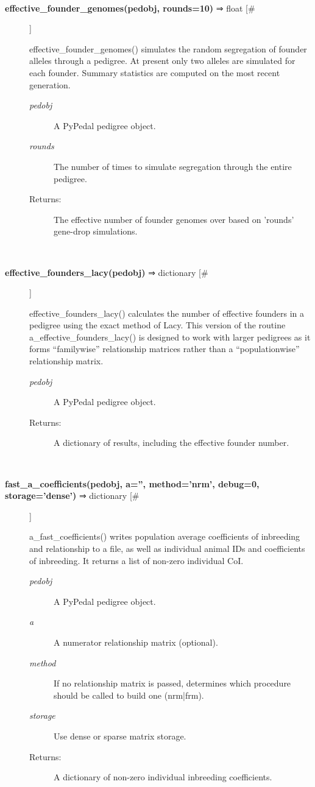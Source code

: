 \documentclass[10pt]{article}
\begin{document}
\begin{description}
\begin{description}
\end{description}
\\ 

\item[\textbf{effective\_founder\_genomes(pedobj, rounds=10)}
 ⇒ float [\#]]

 effective\_founder\_genomes() simulates the random segregation of founder alleles through a pedigree. At present only two alleles are simulated for each founder. Summary statistics are computed on the most recent generation.
\begin{description}
\item[\emph{pedobj}
] A PyPedal pedigree object.
\item[\emph{rounds}
] The number of times to simulate segregation through the entire pedigree.
\item[Returns:] The effective number of founder genomes over based on 'rounds' gene-drop simulations.

\end{description}
\\ 

\item[\textbf{effective\_founders\_lacy(pedobj)}
 ⇒ dictionary [\#]]

 effective\_founders\_lacy() calculates the number of effective founders in a pedigree using the exact method of Lacy. This version of the routine a\_effective\_founders\_lacy() is designed to work with larger pedigrees as it forms ``familywise'' relationship matrices rather than a ``populationwise'' relationship matrix.
\begin{description}
\item[\emph{pedobj}
] A PyPedal pedigree object.
\item[Returns:] A dictionary of results, including the effective founder number.

\end{description}
\\ 

\item[\textbf{fast\_a\_coefficients(pedobj, a='', method='nrm', debug=0, storage='dense')}
 ⇒ dictionary [\#]]

 a\_fast\_coefficients() writes population average coefficients of inbreeding and relationship to a file, as well as individual animal IDs and coefficients of inbreeding. It returns a list of non-zero individual CoI.
\begin{description}
\item[\emph{pedobj}
] A PyPedal pedigree object.
\item[\emph{a}
] A numerator relationship matrix (optional).
\item[\emph{method}
] If no relationship matrix is passed, determines which procedure should be called to build one (nrm|frm).
\item[\emph{storage}
] Use dense or sparse matrix storage.
\item[Returns:] A dictionary of non-zero individual inbreeding coefficients.


\end{description}
\end{description}
\end{document}
